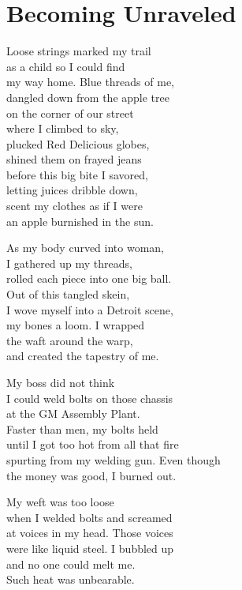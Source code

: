 \documentclass[twoside,10pt]{book}
\begin{document}
\clearpage
\section{Becoming Unraveled}

Loose strings marked my trail\\
as a child so I could find\\
my way home. Blue threads of me,\\
dangled down from the apple tree\\
on the corner of our street\\
where I climbed to sky,\\
plucked Red Delicious globes,\\
shined them on frayed jeans\\
before this big bite I savored,\\
letting juices dribble down,\\
scent my clothes as if I were\\
an apple burnished in the sun.

As my body curved into woman,\\
I gathered up my threads,\\
rolled each piece into one big ball.\\
Out of this tangled skein,\\
I wove myself into a Detroit scene,\\
my bones a loom. I wrapped\\
the waft around the warp,\\
and created the tapestry of me.

My boss did not think\\
I could weld bolts on those chassis\\
at the GM Assembly Plant.\\
Faster than men, my bolts held\\
until I got too hot from all that fire\\
spurting from my welding gun. Even though\\
the money was good, I burned out.

My weft was too loose\\
when I welded bolts and screamed\\
at voices in my head. Those voices\\
were like liquid steel. I bubbled up\\
and no one could melt me.\\
Such heat was unbearable.
\end{document}
